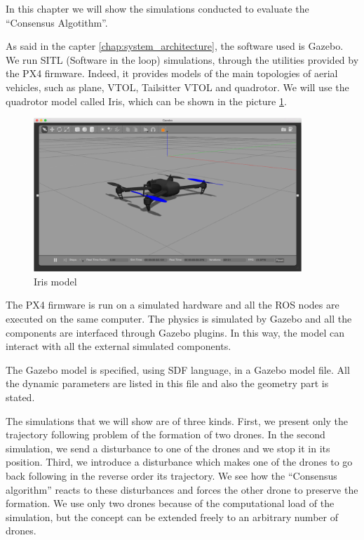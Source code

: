 In this chapter we will show the simulations conducted to evaluate the “Consensus
Algotithm”.

As said in the capter \ref{chap:system_architecture}, the software used is Gazebo.
We run SITL (Software in the loop) simulations, through the utilities provided by
the PX4 firmware. Indeed, it provides models of the main topologies of aerial vehicles,
such as plane, VTOL, Tailsitter VTOL and quadrotor.
We will use the quadrotor model called Iris, which can be shown in the picture \ref{fig:iris_model}.

\begin{figure}[h]
\centering
\includegraphics[width=0.9\textwidth]{chapters/chapter-04/figures/iris_model.png}
\caption{Iris model}
\label{fig:iris_model}
\end{figure}

The PX4 firmware is run on a simulated hardware and all the ROS nodes are executed
on the same computer. The physics is simulated by Gazebo and all the components
are interfaced through Gazebo plugins. In this way, the model can interact with
all the external simulated components.

The Gazebo model is specified, using SDF language, in a Gazebo model file.
All the dynamic parameters are listed in this file and also the geometry part
is stated.

The simulations that we will show are of three kinds. First, we present only
the trajectory following problem of the formation of two drones.
In the second simulation, we send a disturbance to one of the drones and we stop it
in its position. Third, we introduce a disturbance which makes one of the drones to
go back following in the reverse order its trajectory.
We see how the “Consensus algorithm” reacts to these disturbances and forces the other
drone to preserve the formation.
We use only two drones because of the computational load of the simulation, but the
concept can be extended freely to an arbitrary number of drones.

